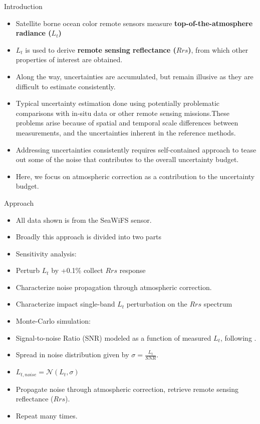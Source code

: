\documentclass[final]{beamer}
\newlength{\onecolwid}
\begin{document}
\begin{frame}[t]
\begin{columns}[t]
\begin{column}{\onecolwid}
\begin{block}{Introduction}
\begin{itemize}
\item Satellite borne ocean color remote sensors measure \textbf{top-of-the-atmosphere radiance ($L_t$)}
\item $L_t$ is used to derive \textbf{remote sensing reflectance ($Rrs$)}, from which other  properties of interest are obtained.
\item Along the way, uncertainties are accumulated, but remain illusive as they are difficult to estimate consistently.
\item Typical uncertainty estimation done using potentially problematic comparisons with in-situ data or other remote sensing missions\cite{BW:2006,Tle:2000,Hu:2013}.These problems arise because of spatial and temporal scale differences between measurements, and the uncertainties inherent in the reference methods.
\item Addressing uncertainties consistently requires self-contained approach to tease out  some of the noise that contributes to the overall uncertainty budget.
\item Here, we focus on atmospheric correction as a contribution to the uncertainty budget.
\end{itemize}
\end{block}



\begin{block}{Approach}
\begin{itemize}
\item All data shown is from the SeaWiFS sensor.
\item Broadly this approach is divided into two parts
\item Sensitivity analysis:
	
	\item Perturb $L_t$ by +0.1\% collect   $Rrs$ response 
	\item Characterize noise propagation through atmospheric correction.
	\item Characterize impact single-band $L_t$ perturbation on the $Rrs$ spectrum

\item Monte-Carlo simulation:

	\item Signal-to-noise Ratio (SNR) modeled as a function of measured $L_t$, following \cite{Barnes:1994}.
	\item Spread in noise distribution given by $\sigma = \frac{L_t}{SNR}$.
	\item $L_{t,noise} = \mathcal{N}(L_t, \sigma)$
	\item Propagate noise through atmospheric correction, retrieve remote sensing reflectance ($Rrs$).
	\item Repeat many times.


\end{itemize}
\end{block}
\end{column}
\end{columns}
\end{frame}
\end{document}
